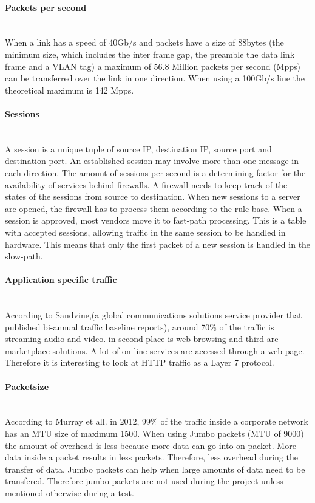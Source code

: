 \paragraph{Packets per second}\label{par:pps}\mbox{}\\
When a link has a speed of 40Gb/s and packets have a size of 88bytes (the minimum size, which includes the inter frame gap, the preamble the data link frame and a VLAN tag) a maximum of 56.8 Million packets per second (Mpps) can be transferred over the link in one direction. When using a 100Gb/s line the theoretical maximum is 142 Mpps.   

\paragraph{Sessions}\label{par:sessions}\mbox{}\\
A session is a unique tuple of source IP, destination IP, source port and destination port. An established session may involve more than one message in each direction.
The amount of sessions per second is a determining factor for the availability of services behind firewalls. A firewall needs to keep track of the states of the sessions from source to destination. 
When new sessions to a server are opened, the firewall has to process them according to the rule base. When a session is approved, most vendors move it to fast-path processing. 
This is a table with accepted sessions, allowing traffic in the same session to be handled in hardware. This means that only the first packet of a new session is handled in the slow-path.

\paragraph{Application specific traffic}\mbox{} \\
According to Sandvine,(a global communications solutions service provider that published bi-annual traffic baseline reports), around 70\% of the traffic is streaming audio and video. in second place is web browsing and third are marketplace solutions. A lot of on-line services are accessed through a web page. 
Therefore it is interesting to look at HTTP traffic as a Layer 7 protocol.

\paragraph{Packetsize}\label{par:packetsize}\mbox{}\\
According to Murray et all. \cite{murray2012state}  in 2012, 99\% of the traffic inside a corporate network has an MTU size of maximum 1500. When using Jumbo packets (MTU of 9000) the amount of overhead is less because more data can go into on packet. More data inside a packet results in less packets. Therefore, less overhead during the transfer of data. 
Jumbo packets can help when large amounts of data need to be transfered.  
Therefore jumbo packets are not used during the project unless mentioned otherwise during a test.

